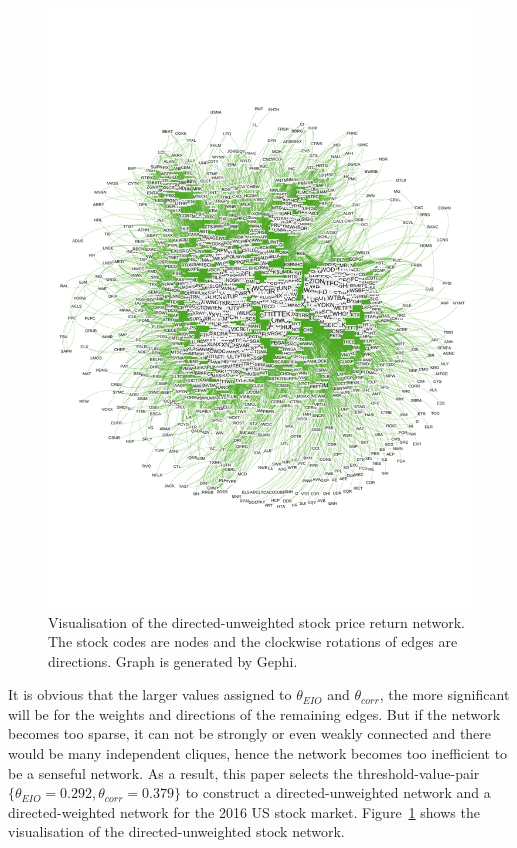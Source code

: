\begin{figure}
	\begin{center}
		\includegraphics[width=14cm]{Graph_01}
	\end{center}
	\caption{Visualisation of the directed-unweighted stock price return network. The stock codes are nodes and the clockwise rotations of edges are directions. Graph is generated by Gephi.}
	\label{fig:Graph_01}
\end{figure}

It is obvious that the larger values assigned to $\theta_{EIO}$ and $\theta_{corr}$, the more significant will be for the weights and directions of the remaining edges. But if the network becomes too sparse, it can not be strongly or even weakly connected and there would be many independent cliques, hence the network becomes too inefficient to be a senseful network. As a result, this paper selects the threshold-value-pair $\{\theta_{EIO}=0.292, \theta_{corr}=0.379\}$ to construct a directed-unweighted network and a directed-weighted network for the 2016 US stock market. Figure~\ref{fig:Graph_01} shows the visualisation of the directed-unweighted stock network.

